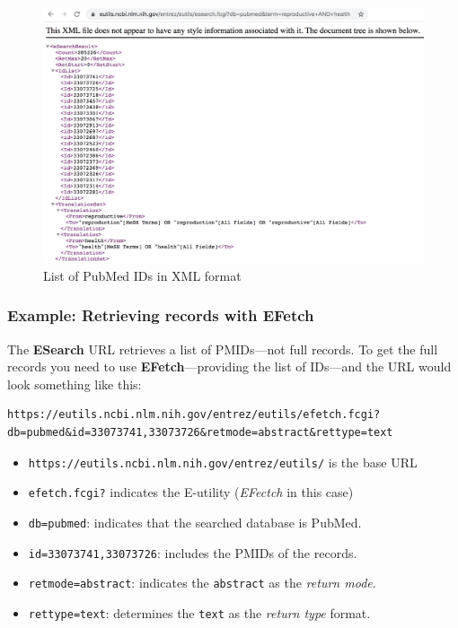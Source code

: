 \documentclass[
]{book}
\begin{document}
\begin{figure}

{\centering \includegraphics[width=0.8\linewidth]{images/api/pubmed-esearch} 

}

\caption{List of PubMed IDs in XML format}\label{fig:unnamed-chunk-134}
\end{figure}

\hypertarget{example-retrieving-records-with-efetch}{%
\subsubsection*{Example: Retrieving records with EFetch}\label{example-retrieving-records-with-efetch}}

The \textbf{ESearch} URL retrieves a list of PMIDs---not full records. To get the
full records you need to use \textbf{EFetch}---providing the list of IDs---and the
URL would look something like this:

\begin{verbatim}
https://eutils.ncbi.nlm.nih.gov/entrez/eutils/efetch.fcgi?db=pubmed&id=33073741,33073726&retmode=abstract&rettype=text
\end{verbatim}

\begin{itemize}
\item
  \texttt{https://eutils.ncbi.nlm.nih.gov/entrez/eutils/} is the base URL
\item
  \texttt{efetch.fcgi?} indicates the E-utility (\emph{EFectch} in this case)
\item
  \texttt{db=pubmed}: indicates that the searched database is PubMed.
\item
  \texttt{id=33073741,33073726}: includes the PMIDs of the records.
\item
  \texttt{retmode=abstract}: indicates the \texttt{abstract} as the \emph{return mode}.
\item
  \texttt{rettype=text}: determines the \texttt{text} as the \emph{return type} format.
\end{itemize}
\end{document}
